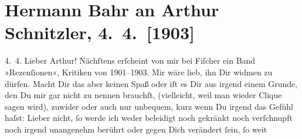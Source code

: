 

         
         \renewcommand{\erwaehntePersonen}{Personen: Hermann Bahr, Rosa Bahr, Samuel Fischer, Olga Schnitzler}
         \renewcommand{\erwaehnteOrte}{Orte: Konservatorium der Gesellschaft der Musikfreunde, Wien}
         \renewcommand{\erwaehnteWerke}{Werke: Neues Wiener Journal, Rezensionen. Wiener Theater 1901 bis 1903}
               \section[Hermann Bahr an Arthur Schnitzler, 4. 4. {[}1903{]}]{ Hermann Bahr an Arthur Schnitzler, 4. 4. {[}1903{]}}\nopagebreak{}\rehead{ }\begin{ledgroupsized}[t]{13cm}\normalsize\beginnumbering{} \toendnotes[C]{\smallbreak\pagebreak[2]} 
\toendnotes[C]{\smallbreak}\pstart
           \raggedleft{}{\pb}4. 4.\pend
           \pstart\center{}Lieber Arthur!\pend\pstart
           Nächſtens erſcheint von mir bei Fiſcher ein
               Band »Rezenſionen«, Kritiken von 1901–1903. Mir
               wäre lieb, ihn Dir widmen zu dürfen. Macht Dir das aber keinen Spaß oder iſt es Dir
               aus irgend einem Grunde, den Du mir gar nicht zu nennen brauchſt, (vielleicht, weil
               man wieder Clique sagen wird), zuwider oder auch nur unbequem, kurz wenn Du irgend
               das Gefühl haſst: Lieber nicht, ſo werde ich weder beleidigt noch gekränkt noch
               verſchnupft noch irgend unangenehm berührt oder gegen Dich verändert ſein, ſo weit

\end{ledgroupsized}
